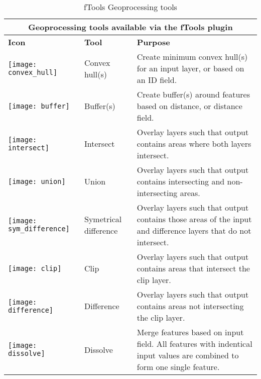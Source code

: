\begin{table}[ht]
\centering
\caption{fTools Geoprocessing tools}\label{tab:ftool_geoprocessing}\medskip
 \begin{tabular}{|p{0.3in}|p{0.8in}|p{5.1in}|}
 \hline \multicolumn{3}{|c|}{\textbf{Geoprocessing tools available via the fTools plugin}} \\
 \hline \textbf{Icon} & \textbf{Tool} & \textbf{Purpose} \\
 \hline \texttt{[image: convex\_hull]} & Convex hull(s) & Create 
minimum convex hull(s) for an input layer, or based on an ID field. \\
 \hline \texttt{[image: buffer]} & Buffer(s) & Create 
buffer(s) around features based on distance, or distance field. \\
 \hline \texttt{[image: intersect]} & Intersect & Overlay 
layers such that output contains areas where both layers intersect. \\
 \hline \texttt{[image: union]} & Union & Overlay layers such 
that output contains intersecting and non-intersecting areas. \\
 \hline \texttt{[image: sym\_difference]} & Symetrical difference & 
Overlay layers such that output contains those areas of the input and 
difference layers that do not intersect. \\
 \hline \texttt{[image: clip]} & Clip & Overlay layers such 
that output contains areas that intersect the clip layer. \\
 \hline \texttt{[image: difference]} & Difference & Overlay layers 
such that output contains areas not intersecting the clip layer. \\
 \hline \texttt{[image: dissolve]} & Dissolve & Merge features 
based on input field. All features with indentical input values are combined 
to form one single feature. \\
 \hline
\end{tabular}
\end{table}

